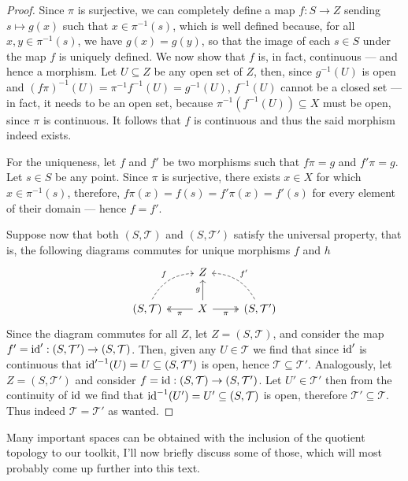 \begin{proof}
Since \(\pi\) is surjective, we can completely define a map \(f: S \to Z\)
sending \(s \mapsto g(x)\) such that \(x \in \pi^{-1}(s)\), which is well
defined because, for all \(x, y \in \pi^{-1}(s)\), we have \(g(x) = g(y)\), so
that the image of each \(s \in S\) under the map \(f\) is uniquely defined. We
now show that \(f\) is, in fact, continuous --- and hence a morphism. Let \(U
\subseteq Z\) be any open set of \(Z\), then, since \(g^{-1}(U)\) is open and
\((f \pi)^{-1}(U) = \pi^{-1} f^{-1}(U) = g^{-1}(U)\), \(f^{-1}(U)\) cannot be a
closed set --- in fact, it needs to be an open set, because
\(\pi^{-1}(f^{-1}(U)) \subseteq X\) must be open, since \(\pi\) is continuous.
It follows that \(f\) is continuous and thus the said morphism indeed exists.

For the uniqueness, let \(f\) and \(f'\) be two morphisms such that \(f\pi = g\)
and \(f'\pi = g\). Let \(s \in S\) be any point. Since \(\pi\) is surjective,
there exists \(x \in X\) for which \(x \in \pi^{-1}(s)\), therefore, \(f \pi(x)
= f(s) = f'\pi(x) = f'(s)\) for every element of their domain --- hence \(f =
f'\).

Suppose now that both \((S, \mathcal T)\) and \((S, \mathcal T')\) satisfy the
universal property, that is, the following diagrams commutes for unique
morphisms \(f\) and \(h\)
\[
  \begin{tikzcd}
    &Z & \\
    (S, \mathcal T) \ar[ur, dashed, bend left, "f"]
    &X \ar[l, two heads, "\pi"] \ar[r, swap, two heads, "\pi"] \ar[u, "g"]
    &(S, \mathcal T') \ar[ul, dashed, bend right, swap, "f'"]
  \end{tikzcd}
\]
Since the diagram commutes for all \(Z\), let \(Z = (S, \mathcal T)\), and
consider the map \(f' = \operatorname{id}': (S, \mathcal T') \to (S, \mathcal T)\). Then,
given any \(U \in \mathcal T\) we find that since \(\operatorname{id}'\) is continuous that
\(\operatorname{id}'^{-1}(U) = U \subseteq (S, \mathcal T')\) is open, hence \(\mathcal T
\subseteq \mathcal T'\). Analogously, let \(Z = (S, \mathcal T')\) and consider
\(f = \operatorname{id}: (S, \mathcal T) \to (S, \mathcal T')\). Let \(U' \in \mathcal T'\)
then from the continuity of \(\operatorname{id}\) we find that \(\operatorname{id}^{-1}(U') = U' \subseteq
(S, \mathcal T)\) is open, therefore \(\mathcal T' \subseteq \mathcal T\). Thus
indeed \(\mathcal T = \mathcal T'\) as wanted.
\end{proof}

Many important spaces can be obtained with the inclusion of the quotient
topology to our toolkit, I'll now briefly discuss some of those, which will most
probably come up further into this text.

